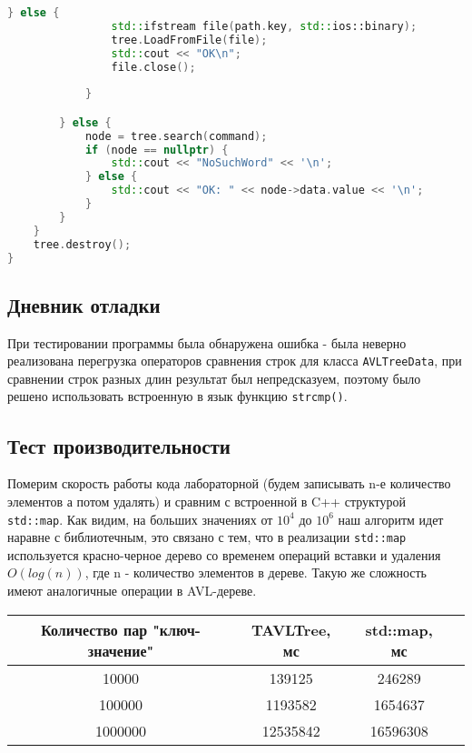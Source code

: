 \documentclass[12pt]{article}
\begin{document}
\begin{lstlisting}[language=C++]
            } else {
                std::ifstream file(path.key, std::ios::binary);
                tree.LoadFromFile(file);
                std::cout << "OK\n";
                file.close();
   
            }

        } else {
            node = tree.search(command);
            if (node == nullptr) {
                std::cout << "NoSuchWord" << '\n';
            } else {
                std::cout << "OK: " << node->data.value << '\n';
            }
        }
    }
    tree.destroy();
}
\end{lstlisting}

\subsection*{Дневник отладки}

При тестировании программы была обнаружена ошибка - была неверно реализована перегрузка операторов сравнения строк для класса \texttt{AVLTreeData}, при сравнении строк разных длин результат был непредсказуем, поэтому было решено использовать встроенную в язык функцию \texttt{strcmp()}.

\subsection*{Тест производительности}

Померим скорость работы кода лабораторной (будем записывать n-е количество элементов а потом удалять) и сравним с встроенной в C++ структурой \texttt{std::map}. Как видим, на больших значениях от $10^4$ до $10^6$ наш алгоритм идет наравне с библиотечным, это связано с тем, что в реализации \texttt{std::map} используется красно-черное дерево со временем операций вставки и удаления $O(log(n))$, где n - количество элементов в дереве. Такую же сложность имеют аналогичные операции в AVL-дереве.

\begin{center}
\begin{tabular}{ |c|c|c|c| }
    \hline
    Количество пар "ключ-значение" & TAVLTree, мс & std::map, мс \\
    \hline
    10000 & 139125 & 246289 \\
    100000 & 1193582 & 1654637 \\
    1000000 & 12535842 & 16596308 \\
    \hline
    \end{tabular}
\end{center}
\end{document}
